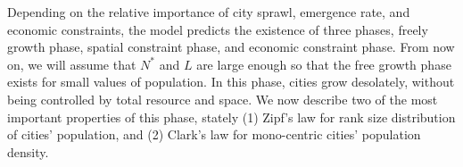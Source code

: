 \documentclass[reprint,unsortedaddress,amsmath,amssymb,floatfix,aps,prl,showkeys]{revtex4-2}
\begin{document}

Depending on the relative importance of city sprawl, emergence rate, and economic constraints, the model predicts the existence of three phases, freely growth phase, spatial constraint phase, and economic constraint phase. From now on, we will assume that $N^*$ and $L$ are large enough so that the free growth phase exists for small values of population. In this phase, cities grow desolately, without being controlled by total resource and space. We now describe two of the most important properties of this phase, stately (1) Zipf's law\cite{gabaix1999zipf's} for rank size distribution of cities' population, and (2) Clark's law for mono-centric cities' population density. 
\end{document}

